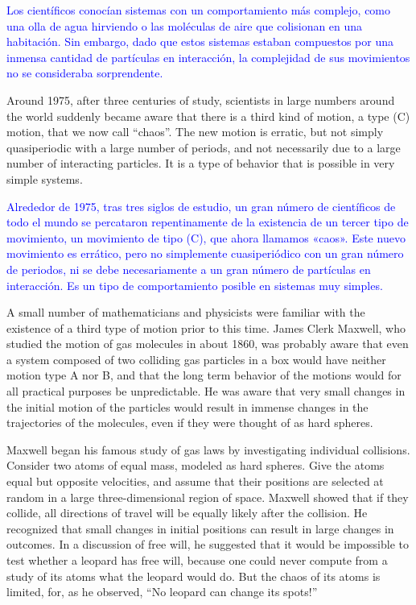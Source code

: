 \documentclass[12pt]{article}
\begin{document}
\textcolor{blue}{Los científicos conocían sistemas con un comportamiento más complejo, como una olla de agua hirviendo o las moléculas de aire que 
colisionan en una habitación. Sin embargo, dado que estos sistemas estaban compuestos por una inmensa cantidad de partículas en interacción, la 
complejidad de sus movimientos no se consideraba sorprendente.}

Around 1975, after three centuries of study, scientists in large numbers around the world suddenly became 
aware that there is a third kind of motion, a type (C) motion, that we now call “chaos”. The new motion is 
erratic, but not simply quasiperiodic with a large number of periods, and not necessarily due to a large 
number of interacting particles. It is a type of behavior that is possible in very simple systems.

\textcolor{blue}{Alrededor de 1975, tras tres siglos de estudio, un gran número de científicos de todo el mundo se percataron repentinamente de la 
existencia de un tercer tipo de movimiento, un movimiento de tipo (C), que ahora llamamos «caos». Este nuevo movimiento es errático, pero no 
simplemente cuasiperiódico con un gran número de periodos, ni se debe necesariamente a un gran número de partículas en interacción. Es un tipo de 
comportamiento posible en sistemas muy simples.}

 A small number of mathematicians and physicists were familiar 
with the existence of a third type of motion prior to this time. James Clerk Maxwell, who studied the motion of gas molecules in about 1860, was 
probably aware that even a system composed of two colliding gas particles in a box would have neither 
motion type A nor B, and that the long term behavior of the motions would for all practical purposes be 
unpredictable. He was aware that very small changes in the initial motion of the particles would result in 
immense changes in the trajectories of the molecules, even if they were thought of as hard spheres.

Maxwell began his famous study of gas laws by investigating individual collisions. Consider two atoms of 
equal mass, modeled as hard spheres. Give the atoms equal but opposite velocities, and assume that their 
positions are selected at random in a large three-dimensional region of space. Maxwell showed that if they 
collide, all directions of travel will be equally likely after the collision. He recognized that small 
changes in initial positions can result in large changes in outcomes. In a discussion of free will, he 
suggested that it would be impossible to test whether a leopard has free will, because one could never 
compute from a study of its atoms what the leopard would do. But the chaos of its atoms is limited, for, as 
he observed, “No leopard can change its spots!”
\end{document}
